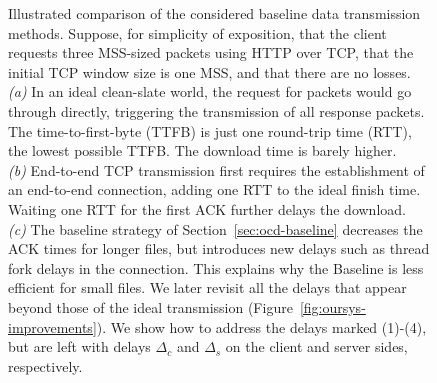\begin{figure}[!t]
    \caption{Illustrated comparison of the considered baseline data transmission methods. Suppose, for simplicity of exposition, that the client requests three MSS-sized packets using HTTP over TCP, that the initial TCP window size is one MSS, and that there are no losses.\\ \textit{(a)} In an ideal clean-slate world, the request for packets would go through directly, triggering the transmission of all response packets. The time-to-first-byte (TTFB) is just one round-trip time (RTT), the lowest possible TTFB. The download time is barely higher.\\ \textit{(b)} End-to-end TCP transmission first requires the establishment of an end-to-end connection, adding one RTT to the ideal finish time. Waiting one RTT for the first ACK further delays the download. \\ \textit{(c)} The baseline strategy of Section~\ref{sec:ocd-baseline} decreases the ACK times for longer files, but introduces new delays such as thread fork delays in the connection. This explains why the Baseline is less efficient for small files. We later revisit all the delays that appear beyond those of the ideal transmission (Figure~\ref{fig:oursys-improvements}). We show how to address the delays marked (1)-(4), but are left with delays $\Delta_c$ and $\Delta_s$ on the client and server sides, respectively.  }
\end{figure}

